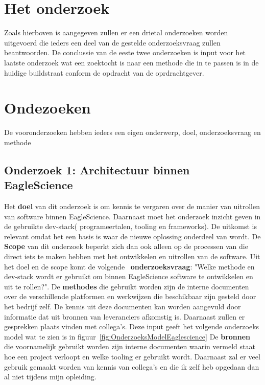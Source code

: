 \section{Het onderzoek}\label{sec:methodeonderzoek}
Zoals hierboven is aangegeven zullen er een drietal onderzoeken worden uitgevoerd die ieders een deel van de gestelde onderzoeksvraag zullen beantwoorden. De conclussie van de eeste twee onderzoeken is input voor het laatste onderzoek wat een zoektocht is naar een methode die in te passen is in de huidige buildstraat conform de opdracht van de oprdrachtgever.
\section{Ondezoeken}\label{sec:onderzoeken}
De vooronderzoeken hebben ieders een eigen onderwerp, doel, onderzoeksvraag en methode
\subsection{Onderzoek 1: Architectuur binnen EagleScience}\label{subsec:onderzoeksmethode-architectuur-binnen-eaglescience}
Het \textbf{doel} van dit onderzoek is om kennis te vergaren over de manier van uitrollen van software binnen EagleScience. Daarnaast moet het onderzoek inzicht geven in de gebruikte dev-stack( programeertalen, tooling en frameworks). De uitkomst is relevant omdat het een basis is waar de nieuwe oplossing onderdeel van wordt. De \textbf{Scope} van dit onderzoek beperkt zich dan ook alleen op de processen van die direct iets te maken hebben met het ontwikkelen en uitrollen van de software. Uit het doel en de scope komt de volgende ~\textbf{onderzoeksvraag}: "Welke methode en dev-stack wordt er gebruikt om binnen EagleScience software te ontwikkelen en uit te rollen?". De \textbf{methodes} die gebruikt worden zijn de interne documenten over de verschillende platformen en werkwijzen die beschikbaar zijn gesteld door het bedrijf zelf. De kennis uit deze documenten kan worden aangevuld door informatie dat uit bronnen van leveranciers afkomstig is. Daarnaast zullen er gesprekken plaats vinden met collega's. Deze input geeft het volgende onderzoeks model wat te zien is in figuur~\ref{fig:OnderzoeksModelEaglescience}
De \textbf{bronnen} die voornamelijk gebruikt worden zijn interne documenten waarin vermeld staat hoe een project verloopt en welke tooling er gebruikt wordt. Daarnaast zal er veel gebruik gemaakt worden van kennis van collega's en die ik zelf heb opgedaan dan al niet tijdens mijn opleiding.

